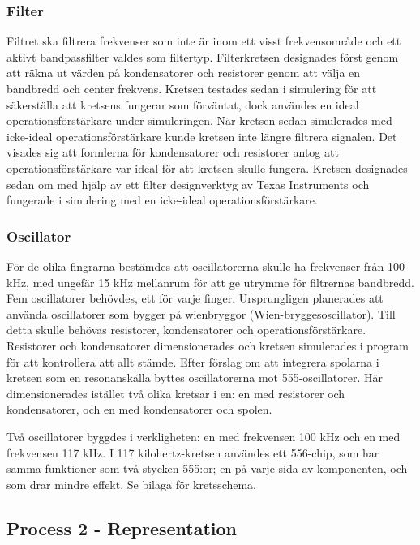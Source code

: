 \documentclass[a4paper]{article}
\begin{document}
\begin{sloppypar}
  \subsubsection{Filter}
  Filtret ska filtrera frekvenser som inte är inom ett visst frekvensområde och ett aktivt bandpassfilter valdes som filtertyp.
  Filterkretsen designades först genom att räkna ut värden på kondensatorer och resistorer genom att välja en bandbredd och center frekvens.
  Kretsen testades sedan i simulering för att säkerställa att kretsens fungerar som förväntat,
  dock användes en ideal operationsförstärkare under simuleringen.
  När kretsen sedan simulerades med icke-ideal operationsförstärkare kunde kretsen inte längre filtrera signalen.
  Det visades sig att formlerna för kondensatorer och resistorer
  antog att operationsförstärkare var ideal för att kretsen skulle fungera.
  Kretsen designades sedan om med hjälp av ett filter designverktyg av Texas Instruments
  och fungerade i simulering med en icke-ideal operationsförstärkare.

  \subsubsection{Oscillator}
  För de olika fingrarna bestämdes att oscillatorerna skulle ha frekvenser från 100 kHz, med ungefär 15 kHz mellanrum för att ge utrymme för filtrernas bandbredd. Fem oscillatorer behövdes, ett för varje finger.
  Ursprungligen planerades att använda oscillatorer som bygger på wienbryggor (Wien-bryggesoscillator).
  Till detta skulle behövas resistorer, kondensatorer och operationsförstärkare. Resistorer och kondensatorer dimensionerades och kretsen simulerades i program för att kontrollera att allt stämde.
  Efter förslag om att integrera spolarna i kretsen som en resonanskälla byttes oscillatorerna mot 555-oscillatorer.
  Här dimensionerades istället två olika kretsar i en: en med resistorer och kondensatorer, och en med kondensatorer och spolen.

  Två oscillatorer byggdes i verkligheten: en med frekvensen 100 kHz och en med frekvensen 117 kHz.
  I 117 kilohertz-kretsen användes ett 556-chip, som har samma funktioner som två stycken 555:or; en på varje sida av komponenten, och som drar mindre effekt. Se bilaga för kretsschema.


  \subsection{Process 2 - Representation}


\end{sloppypar}
\end{document}
